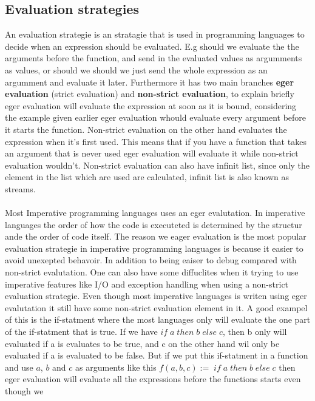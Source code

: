 \subsection{Evaluation strategies}
An evaluation strategie is an stratagie that is used in programming languages to decide when
an expression should be evaluated. E.g should we evaluate the the arguments before the function, and send in 
the evaluated values as argumments as values, or should we should we just send the whole expression as an argumment 
and evaluate it later. Furthermore it has two main branches \textbf{eger evaluation} (strict evaluation) and \textbf{non-strict evaluation}, to explain briefly 
eger evaluation will evaluate the expression at soon as it is bound, considering the example given earlier eger evaluation whould evaluate every 
argument before it starts the function. Non-strict evaluation on the other hand evaluates the expression when it's
first used. This means that if you have a function that takes an argument that is never used eger evaluation will evaluate it while 
non-strict evaluation wouldn't. Non-strict evaluation can also have infinit list, since only the element in the list which are used are 
calculated, infinit list is also known as streams. 
\\ \\
Most Imperative programming languages uses an eger evalutation. In imperative languages the order of how the code is 
executeted is determined by the structur ande the order of code itself. The reason we eager evaluation is the most popular 
evaluation strategie in imperative programming languages is because it easier to avoid unexepted behavoir.  In addition to being eaiser to 
debug compared with non-strict evalutation. One can also have some diffuclites when it trying to use imperative features like I/O and exception handling 
when using a non-strict evaluation strategie. Even though most imperative languages is writen using eger evalutation it still have some non-strict evaluation element in it. 
A good exampel of this is the if-statment where the most languages only will evaluate the one part of the if-statment that is true. If we have $if\; a\; then\; b\; else\; c$, then b only 
will evaluated if a is evaluates to be true, and c on the other hand wil only be evaluated if a is evaluated to be false. But if we put this if-statment in a function and use $a$, $b$ and
$c$ as arguments like this $f(a, b ,c):= \; if\; a\; then\; b\; else\; c$ then eger evaluation will evaluate all the expressions before the functions starts even though we 
